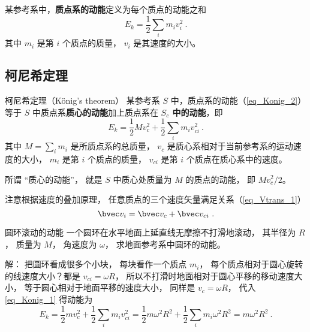 

某参考系中，\textbf{质点系的动能}定义为每个质点的动能之和
\begin{equation}\label{eq_Konig_2}
E_k = \frac12 \sum_i m_i v_{i}^2 ~.
\end{equation}
其中 $m_i$ 是第 $i$ 个质点的质量， $v_i$ 是其速度的大小。

\subsection{柯尼希定理}

\begin{theorem}{柯尼希定理（König's theorem）}
某参考系 $S$ 中，质点系的动能（\autoref{eq_Konig_2}）等于 $S$ 中质点系\textbf{质心的动能}加上质点系在\textbf{ $S_c$ 中的动能}，即
\begin{equation}\label{eq_Konig_1}
E_k = \frac12 Mv_c^2 + \frac12 \sum_i m_i v_{ci}^2 ~.
\end{equation}
其中 $M=\sum_i m_i$ 是所质点系的总质量， $v_c$ 是质心系相对于当前参考系的运动速度的大小， $m_i$ 是第 $i$ 个质点的质量， $v_{ci}$ 是第 $i$ 个质点在质心系中的速度。

所谓 “质心的动能”， 就是 $S$ 中质心处质量为 $M$ 的质点的动能， 即 $Mv_c^2/2$。
\end{theorem}
注意根据速度的叠加原理， 任意质点的三个速度矢量满足关系（\autoref{eq_Vtrans_1}）
\begin{equation}\label{eq_Konig_3}
\bvec v_i = \bvec v_c + \bvec v_{ci}~.
\end{equation}

\begin{example}{圆环滚动的动能}
一个圆环在水平地面上延直线无摩擦不打滑地滚动， 其半径为 $R$， 质量为 $M$， 角速度为 $\omega$， 求地面参考系中圆环的动能。

解： 把圆环看成很多个小块， 每块看作一个质点 $m_i$， 每个质点相对于圆心旋转的线速度大小？都是 $v_{ci} = \omega R$， 所以不打滑时地面相对于圆心平移的移动速度大小， 等于圆心相对于地面平移的速度大小， 同样是 $v_c = \omega R$， 代入\autoref{eq_Konig_1} 得动能为
\begin{equation}
E_k = \frac12 m v_c^2 + \frac12 \sum_i m_i v_{ci}^2 = \frac12 m\omega^2 R^2 + \frac12 \sum_i m_i \omega^2 R^2 = m\omega^2 R^2~.
\end{equation}
\end{example}

